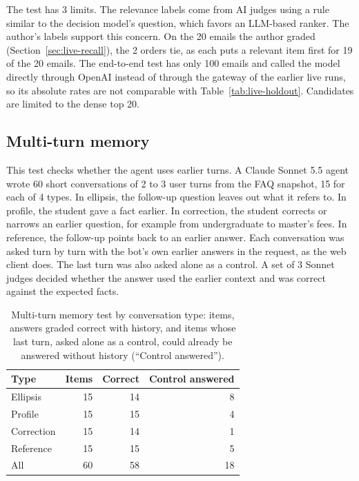The test has 3 limits. The relevance labels come from AI judges using a rule similar to the decision model's question, which favors an LLM-based ranker. The author's labels support this concern. On the 20 emails the author graded (Section~\ref{sec:live-recall}), the 2 orders tie, as each puts a relevant item first for 19 of the 20 emails. The end-to-end test has only 100 emails and called the model directly through OpenAI instead of through the gateway of the earlier live runs, so its absolute rates are not comparable with Table~\ref{tab:live-holdout}. Candidates are limited to the dense top 20.

\subsection{Multi-turn memory}
\label{sec:live-memory}

This test checks whether the agent uses earlier turns. A Claude Sonnet 5.5 agent wrote 60 short conversations of 2 to 3 user turns from the FAQ snapshot, 15 for each of 4 types. In ellipsis, the follow-up question leaves out what it refers to. In profile, the student gave a fact earlier. In correction, the student corrects or narrows an earlier question, for example from undergraduate to master's fees. In reference, the follow-up points back to an earlier answer. Each conversation was asked turn by turn with the bot's own earlier answers in the request, as the web client does. The last turn was also asked alone as a control. A set of 3 Sonnet judges decided whether the answer used the earlier context and was correct against the expected facts.

\begin{table}[htbp]
\centering
\caption{Multi-turn memory test by conversation type: items, answers graded correct with history, and items whose last turn, asked alone as a control, could already be answered without history (``Control answered'').}
\label{tab:live-memory}
\small
\begin{tabular}{@{}lrrr@{}}
\toprule
Type & Items & Correct & Control answered \\
\midrule
Ellipsis & 15 & 14 & 8 \\
Profile & 15 & 15 & 4 \\
Correction & 15 & 14 & 1 \\
Reference & 15 & 15 & 5 \\
\midrule
All & 60 & 58 & 18 \\
\bottomrule
\end{tabular}
\end{table}

